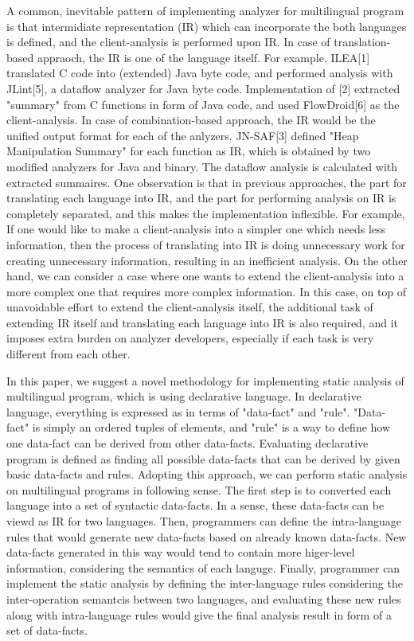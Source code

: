 A common, inevitable pattern of implementing analyzer for multilingual program
is that intermidiate representation (IR) which can incorporate the both
languages is defined, and the client-analysis is performed upon IR. In case of
translation-based appraoch, the IR is one of the language itself. For example, ILEA[1]
translated C code into (extended) Java byte code, and performed analysis with
JLint[5], a dataflow analyzer for Java byte code. Implementation of [2] extracted
"summary" from C functions in form of Java code, and used FlowDroid[6] as the
client-analysis. In case of combination-based approach, the IR would be the unified
output format for each of the anlyzers. JN-SAF[3] defined "Heap Manipulation Summary"
for each function as IR, which is obtained by two modified analyzers for Java
and binary. The dataflow analysis is calculated with extracted summaires.  One
observation is that in previous approaches, the part for translating each
language into IR, and the part for performing analysis on IR is completely
separated, and this makes the implementation inflexible. For example,  If one
would like to make a client-analysis into a simpler one which needs less
information, then the process of translating into IR is doing unnecessary work
for creating unnecessary information, resulting in an inefficient analysis. On
the other hand, we can consider a case where one wants to extend the
client-analysis into a more complex one that requires more complex information.
In this case, on top of unavoidable effort to extend the client-analysis
itself, the additional task of extending IR itself and translating each
language into IR is also required, and it imposes extra burden on analyzer
developers, especially if each task is very different from each other.

In this paper, we suggest a novel methodology for implementing static analysis
of multilingual program, which is using declarative language.  In declarative
language, everything is expressed as in terms of "data-fact" and "rule".
"Data-fact" is simply an ordered tuples of elements, and "rule" is a way to
define how one data-fact can be derived from other data-facts. Evaluating
declarative program is defined as finding all possible data-facts that can be
derived by given basic data-facts and rules.  Adopting this approach, we can
perform static analysis on multilingual programs in following sense.  The first
step is to converted each language into a set of syntactic data-facts. In a
sense, these data-facts can be viewd as IR for two languages.  Then,
programmers can define the intra-language rules that would generate new
data-facts based on already known data-facts. New data-facts generated in this
way would tend to contain more higer-level information, considering the
semantics of each languge. Finally, programmer can implement the static
analysis by defining the inter-language rules considering the inter-operation
semantcis between two languages, and evaluating these new rules along with
intra-language rules would give the final analysis result in form of a set of
data-facts.


